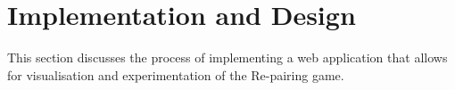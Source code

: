 \chapter{Implementation and Design} This section discusses the process of implementing a web application that allows for visualisation and experimentation of the Re-pairing game. 